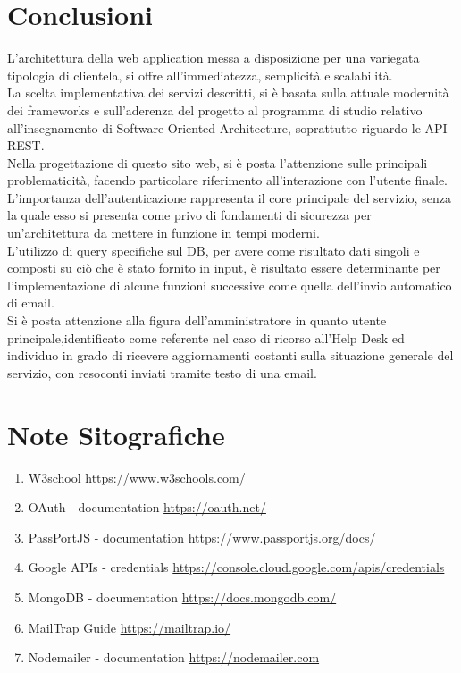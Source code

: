 \section{Conclusioni}
\begin{flushleft}


L'architettura della web application messa a disposizione per una variegata tipologia di clientela, si offre all'immediatezza, semplicità e scalabilità.\\
La scelta implementativa dei servizi descritti, si è basata sulla attuale modernità dei frameworks e sull'aderenza del progetto al programma di studio relativo all'insegnamento di Software Oriented Architecture, soprattutto riguardo le API REST.\\
Nella progettazione di questo sito web, si è posta l'attenzione sulle principali problematicità, facendo particolare riferimento all’interazione con l’utente finale.\\
L'importanza dell'autenticazione rappresenta il core principale del servizio, senza la quale esso si presenta come privo di fondamenti di sicurezza per un'architettura da mettere in funzione in tempi moderni.\\
L’utilizzo di query specifiche sul DB, per avere come risultato dati singoli e composti su ciò che è stato fornito in input, è risultato essere determinante per l’implementazione di alcune funzioni successive come quella dell’invio automatico di email.\\
Si è posta attenzione alla figura dell’amministratore in quanto utente principale,identificato come referente nel caso di ricorso all’Help Desk ed individuo in grado di ricevere aggiornamenti costanti sulla situazione generale del servizio, con resoconti inviati tramite testo di una email.

\section{Note Sitografiche}
\begin{enumerate}

\item W3school \url{https://www.w3schools.com/}\\
\item OAuth - documentation \url{https://oauth.net/}\\
\item PassPortJS - documentation https://www.passportjs.org/docs/
\item Google APIs - credentials \url{https://console.cloud.google.com/apis/credentials}\\
\item MongoDB - documentation \url{https://docs.mongodb.com/}\\
\item MailTrap Guide \url{https://mailtrap.io/}\\
\item Nodemailer - documentation \url{https://nodemailer.com}\\
   
\end{enumerate}
\end{flushleft}